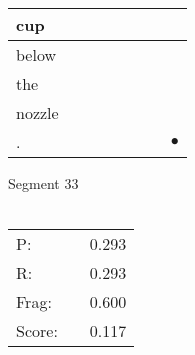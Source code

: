 \documentclass[landscape]{article}
\newcommand{\ssp}{\hspace{2pt}}
\newcommand{\mex}{\cellcolor{g}$\bullet$}
\begin{document}
\begin{tabular}{|l|p{10pt}|p{10pt}|p{10pt}|p{10pt}|p{10pt}|p{10pt}|p{10pt}|}
\hline
\ssp cup \ssp&\hspace{2pt}&\hspace{2pt}&\hspace{2pt}&\hspace{2pt}&\hspace{2pt}&\hspace{2pt}&\hspace{2pt}\\
\hline
\ssp below \ssp&\hspace{2pt}&\hspace{2pt}&\hspace{2pt}&\hspace{2pt}&\hspace{2pt}&\hspace{2pt}&\hspace{2pt}\\
\hline
\ssp the \ssp&\hspace{2pt}&\hspace{2pt}&\hspace{2pt}&\hspace{2pt}&\hspace{2pt}&\hspace{2pt}&\hspace{2pt}\\
\hline
\ssp nozzle \ssp&\hspace{2pt}&\hspace{2pt}&\hspace{2pt}&\hspace{2pt}&\hspace{2pt}&\hspace{2pt}&\hspace{2pt}\\
\hline
\ssp \cellcolor{ref6}. \ssp&\hspace{2pt}&\hspace{2pt}&\hspace{2pt}&\hspace{2pt}&\hspace{2pt}&\hspace{2pt}&\hspace{2pt}\mex\\
\hline
\end{tabular}

\vspace{6pt}
\noindent Segment 33\\\\
\noindent\begin{tabular}{lm{12pt}r}
\hline
P:&&0.293\\
R:&&0.293\\
Frag:&&0.600\\
Score:&&0.117\\
\end{tabular}
\end{document}
